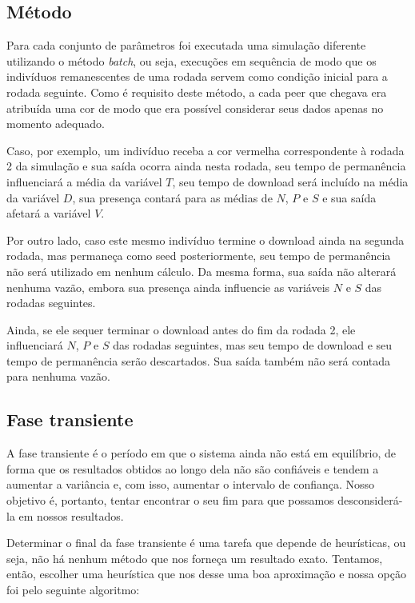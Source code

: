 \documentclass[a4paper,10pt]{article}
\begin{document}
\subsection{Método}

Para cada conjunto de parâmetros foi executada uma simulação diferente utilizando o método \textit{batch}, ou seja, execuções em sequência de modo que os indivíduos remanescentes de uma rodada servem como condição inicial para a rodada seguinte. Como é requisito deste método, a cada peer que chegava era atribuída uma cor de modo que era possível considerar seus dados apenas no momento adequado.

Caso, por exemplo, um indivíduo receba a cor vermelha correspondente à rodada 2 da simulação e sua saída ocorra ainda nesta rodada, seu tempo de permanência influenciará a média da variável $T$, seu tempo de download será incluído na média da variável $D$, sua presença contará para as médias de $N$, $P$ e $S$ e sua saída afetará a variável $V$.

Por outro lado, caso este mesmo indivíduo termine o download ainda na segunda rodada, mas permaneça como seed posteriormente, seu tempo de permanência não será utilizado em nenhum cálculo. Da mesma forma, sua saída não alterará nenhuma vazão, embora sua presença ainda influencie as variáveis $N$ e $S$ das rodadas seguintes.

Ainda, se ele sequer terminar o download antes do fim da rodada 2, ele influenciará $N$, $P$ e $S$ das rodadas seguintes, mas seu tempo de download e seu tempo de permanência serão descartados. Sua saída também não será contada para nenhuma vazão.

\subsection{Fase transiente} %

A fase transiente é o período em que o sistema ainda não está em equilíbrio, de forma que os resultados obtidos ao longo dela não são confiáveis e tendem a aumentar a variância e, com isso, aumentar o intervalo de confiança. Nosso objetivo é, portanto, tentar encontrar o seu fim para que possamos desconsiderá-la em nossos resultados.

Determinar o final da fase transiente é uma tarefa que depende de heurísticas, ou seja, não há nenhum método que nos forneça um resultado exato. Tentamos, então, escolher uma heurística que nos desse uma boa aproximação e nossa opção foi pelo seguinte algoritmo:
\end{document}
